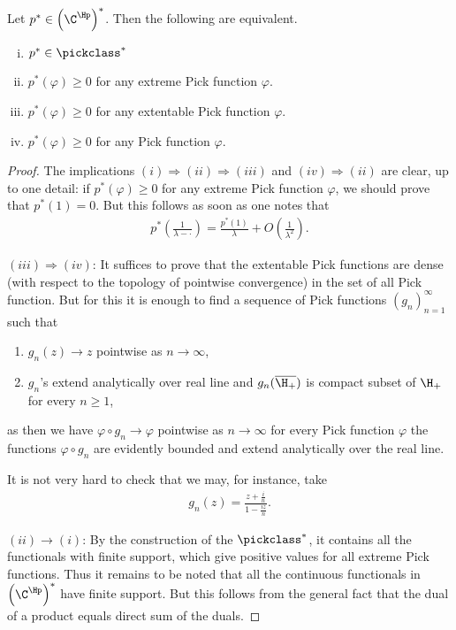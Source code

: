 \begin{lause}\label{pick_functionals}
	Let $p^{*} \in \left(\C^{\Hp}\right)^{*}$. Then the following are equivalent.
	\begin{enumerate}[(i)]
		\item $p^{*} \in \pickclass^{*}$
		\item $p^{*}(\varphi) \geq 0$ for any extreme Pick function $\varphi$.
		\item $p^{*}(\varphi) \geq 0$ for any extentable Pick function $\varphi$.
		\item $p^{*}(\varphi) \geq 0$ for any Pick function $\varphi$.
	\end{enumerate}
\end{lause}
\begin{proof}
	The implications $(i) \Rightarrow (ii) \Rightarrow (iii)$ and $(iv) \Rightarrow (ii)$ are clear, up to one detail: if $p^{*}(\varphi) \geq 0$ for any extreme Pick function $\varphi$, we should prove that $p^{*}(1) = 0$. But this follows as soon as one notes that
	\begin{align*}
		p^{*}\left(\frac{1}{\lambda - \cdot}\right) = \frac{p^{*}\left(1\right)}{\lambda} + O\left(\frac{1}{\lambda^2}\right).
	\end{align*}

	$(iii) \Rightarrow (iv)$: It suffices to prove that the extentable Pick functions are dense (with respect to the topology of pointwise convergence) in the set of all Pick function. But for this it is enough to find a sequence of Pick functions $(g_{n})_{n = 1}^{\infty}$ such that
	\begin{enumerate}
		\item $g_{n}(z) \to z$ pointwise as $n \to \infty$,
		\item $g_{n}$'s extend analytically over real line and $g_{n}(\overline{\H_{+}})$ is compact subset of $\H_{+}$ for every $n \geq 1$,
	\end{enumerate}
	as then we have $\varphi \circ g_{n} \to \varphi$ pointwise as $n \to \infty$ for every Pick function $\varphi$ the functions $\varphi \circ g_{n}$ are evidently bounded and extend analytically over the real line.

	It is not very hard to check that we may, for instance, take
	\begin{align*}
		g_{n}(z) = \frac{z + \frac{i}{n}}{1 - \frac{i z}{n}}.
	\end{align*}

	$(ii) \rightarrow (i)$: By the construction of the $\pickclass^{*}$, it contains all the functionals with finite support, which give positive values for all extreme Pick functions. Thus it remains to be noted that all the continuous functionals in $\left(\C^{\Hp}\right)^{*}$ have finite support. But this follows from the general fact that the dual of a product equals direct sum of the duals.
\end{proof}

